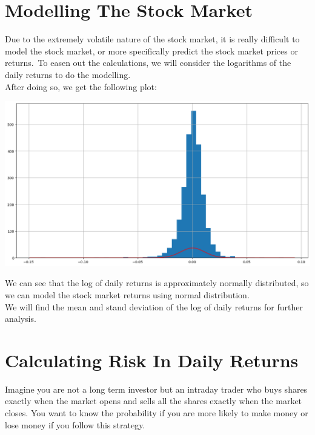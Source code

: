 \documentclass[11pt]{article}
\begin{document}
\section*{Modelling The Stock Market}
\vspace{7mm}

Due to the extremely volatile nature of the stock market, it is really difficult to model the stock market, or more specifically predict the stock market prices or returns.\
To easen out the calculations, we will consider the logarithms of the daily returns to do the modelling.\\

After doing so, we get the following plot:

\begin{center}
 \includegraphics[scale=0.53]{normal.png}
\end{center}
\vspace{5mm}
We can see that the log of daily returns is approximately normally distributed, so we can model the stock market returns using normal distribution. \\

We will find the mean and stand deviation of the log of daily returns for further analysis.
\\

\section*{Calculating Risk In Daily Returns}

Imagine you are not a long term investor but an intraday trader who buys shares exactly when the market opens and sells all the shares exactly when the market closes. You want to know the probability if you are more likely to make money or lose money if you follow this strategy.\\
\end{document}
